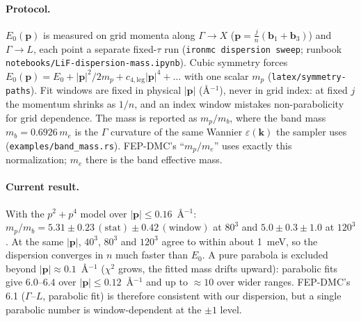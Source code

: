 \documentclass[11pt]{article}
\newcommand{\kv}{\mathbf{k}}
\begin{document}
\paragraph{Protocol.} $E_{0}(\mathbf p)$ is measured on grid momenta along $\Gamma\to X$ ($\mathbf p=\tfrac{j}{n}(\mathbf b_{1}+\mathbf b_{3})$) and $\Gamma\to L$, each point a separate fixed-$\tau$ run (\texttt{ironmc dispersion sweep}; runbook \texttt{notebooks/LiF-dispersion-mass.ipynb}). Cubic symmetry forces $E_{0}(\mathbf p)=E_{0}+|\mathbf p|^{2}/2m_{p}+c_{4,\mathrm{leg}}|\mathbf p|^{4}+\dots$ with one scalar $m_{p}$ (\texttt{latex/symmetry-paths}). Fit windows are fixed in physical $|\mathbf p|$ (\AA$^{-1}$), never in grid index: at fixed $j$ the momentum shrinks as $1/n$, and an index window mistakes non-parabolicity for grid dependence. The mass is reported as $m_{p}/m_{b}$, where the band mass $m_{b}=0.6926\,m_{e}$ is the $\Gamma$ curvature of the same Wannier $\varepsilon(\kv)$ the sampler uses (\texttt{examples/band\_mass.rs}). FEP-DMC's ``$m_{p}/m_{e}$'' uses exactly this normalization; $m_{e}$ there is the band effective mass.

\paragraph{Current result.} With the $p^{2}+p^{4}$ model over $|\mathbf p|\le0.16$~\AA$^{-1}$: $m_{p}/m_{b}=5.31\pm0.23\,(\text{stat})\pm0.42\,(\text{window})$ at $80^{3}$ and $5.0\pm0.3\pm1.0$ at $120^{3}$. At the same $|\mathbf p|$, $40^{3}$, $80^{3}$ and $120^{3}$ agree to within about 1~meV, so the dispersion converges in $n$ much faster than $E_{0}$. A pure parabola is excluded beyond $|\mathbf p|\approx0.1$~\AA$^{-1}$ ($\chi^{2}$ grows, the fitted mass drifts upward): parabolic fits give $6.0$--$6.4$ over $|\mathbf p|\le0.12$~\AA$^{-1}$ and up to $\approx10$ over wider ranges. FEP-DMC's 6.1 ($\Gamma$--$L$, parabolic fit) is therefore consistent with our dispersion, but a single parabolic number is window-dependent at the $\pm1$ level.
\end{document}
